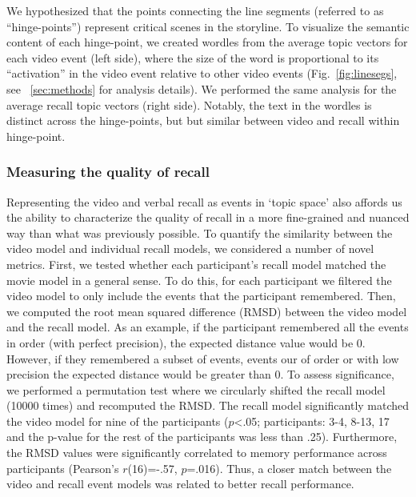 \documentclass{article}
\begin{document}
{We hypothesized that the points connecting the line segments (referred to as ``hinge-points'') represent critical scenes in the storyline. To visualize the semantic content of each hinge-point, we created wordles from the average topic vectors for each video event (left side), where the size of the word is proportional to its ``activation'' in the video event relative to other video events (Fig.~\ref{fig:linesegs}, see ~\ref{sec:methods} for analysis details). We performed the same analysis for the average recall topic vectors (right side). Notably, the text in the wordles is distinct across the hinge-points, but but similar between video and recall within hinge-point.

\subsubsection{Measuring the quality of recall}
Representing the video and verbal recall as events in `topic space' also affords us the ability to characterize the quality of recall in a more fine-grained and nuanced way than what was previously possible. To quantify the similarity between the video model and individual recall models, we considered a number of novel metrics.  First, we tested whether each participant's recall model matched the movie model in a general sense. To do this, for each participant we filtered the video model to only include the events that the participant remembered. Then, we computed the root mean squared difference (RMSD) between the video model and the recall model. As an example, if the participant remembered all the events in order (with perfect precision), the expected distance value would be 0. However, if they remembered a subset of events, events our of order or with low precision the expected distance would be greater than 0. To assess significance, we performed a permutation test where we circularly shifted the recall model (10000 times) and recomputed the RMSD. The recall model significantly matched the video model for nine of the participants ($p$<.05; participants: 3-4, 8-13, 17 and the p-value for the rest of the participants was less than .25). Furthermore, the RMSD values were significantly correlated to memory performance across participants (Pearson's $r$(16)=-.57, $p$=.016). Thus, a closer match between the video and recall event models was related to better recall performance.

}
\end{document}
